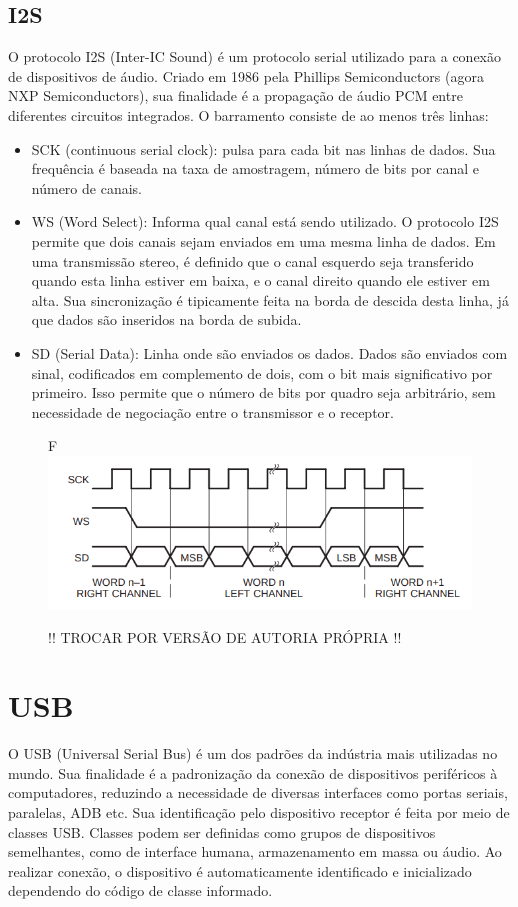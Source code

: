 \subsection{I2S}
O protocolo I2S (Inter-IC Sound) é um protocolo serial utilizado para a conexão de dispositivos de áudio. Criado em 1986 pela Phillips Semiconductors (agora NXP Semiconductors), sua finalidade é a  propagação de áudio PCM entre diferentes circuitos integrados.
O barramento consiste de ao menos três linhas:
\begin{itemize}
    \item SCK (continuous serial clock): pulsa para cada bit nas linhas de dados. Sua frequência é baseada na taxa de amostragem, número de bits por canal e número de canais.
    \item WS (Word Select): Informa qual canal está sendo utilizado. O protocolo I2S permite que dois canais sejam enviados em uma mesma linha de dados. Em uma transmissão stereo, é definido que o canal esquerdo seja transferido quando esta linha estiver em baixa, e o canal direito quando ele estiver em alta. Sua sincronização é tipicamente feita na borda de descida desta linha, já que dados são inseridos na borda de subida.
    \item SD (Serial Data): Linha onde são enviados os dados. Dados são enviados com sinal, codificados em complemento de dois, com o bit mais significativo por primeiro. Isso permite que o número de bits por quadro seja arbitrário, sem necessidade de negociação entre o transmissor e o receptor.
\end{itemize}
\begin{figure}[!h]F
    \includegraphics[scale=0.5]{figuras/i2s-bus.png}
    \caption{!! TROCAR POR VERSÃO DE AUTORIA PRÓPRIA !!}
    \label{fig:circularBuffer}
\end{figure}

\section{USB}
O USB (Universal Serial Bus) é um dos padrões da indústria mais utilizadas no mundo. Sua finalidade é a padronização da conexão de dispositivos periféricos à computadores, reduzindo a necessidade de diversas interfaces como portas seriais, paralelas, ADB etc. 
Sua identificação pelo dispositivo receptor é feita por meio de classes USB. Classes podem ser definidas como grupos de dispositivos semelhantes, como de interface humana, armazenamento em massa ou áudio. Ao realizar conexão, o dispositivo é automaticamente identificado e inicializado dependendo do código de classe informado.

